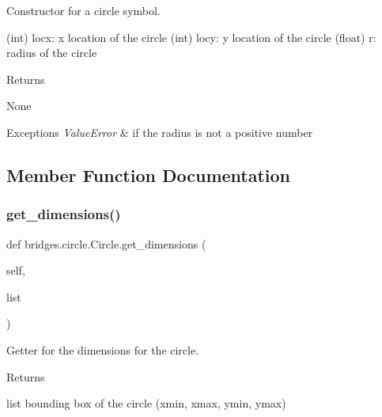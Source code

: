 Constructor for a circle symbol. 

(int) locx\+: x location of the circle (int) locy\+: y location of the circle (float) r\+: radius of the circle \begin{DoxyReturn}{Returns}


None
\end{DoxyReturn}

\begin{DoxyExceptions}{Exceptions}
{\em Value\+Error} & if the radius is not a positive number \\
\hline
\end{DoxyExceptions}


\subsection{Member Function Documentation}
\mbox{\label{classbridges_1_1circle_1_1_circle_a8b6af5d39ec48245f0244a7499082822}} 
\subsubsection{\texorpdfstring{get\+\_\+dimensions()}{get\_dimensions()}}
{\footnotesize\ttfamily def bridges.\+circle.\+Circle.\+get\+\_\+dimensions (\begin{DoxyParamCaption}\item[{}]{self,  }\item[{}]{list }\end{DoxyParamCaption})}



Getter for the dimensions for the circle. 

\begin{DoxyReturn}{Returns}


list bounding box of the circle (xmin, xmax, ymin, ymax) 
\end{DoxyReturn}
\mbox{\label{classbridges_1_1circle_1_1_circle_a7a1be40bcd6028dab0a5bcab6e69c355}} 
